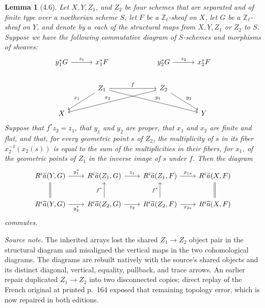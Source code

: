 \documentclass[10pt]{article}
\newcommand{\Z}{\mathbb Z}
\newtheorem*{lemma}{Lemma}
\begin{document}
\begin{lemma}[4.6]
Let $X,Y,Z_1$, and $Z_2$ be four schemes that are separated and of finite type over a noetherian scheme $S$, let $F$ be a $\Z_\ell$-sheaf on $X$, let $G$ be a $\Z_\ell$-sheaf on $Y$, and denote by $a$ each of the structural maps from $X,Y,Z_1$ or $Z_2$ to $S$. Suppose we have the following commutative diagram of $S$-schemes and morphisms of sheaves:
\begin{equation*}
\begin{tikzcd}[column sep=3.0em,row sep=2.0em]
y_1^*G \arrow[r,"z_1"] & x_1^*F && y_2^*G \arrow[r,"z_2"] & x_2^*F \\
& Z_1 \arrow[rr,"f"] \arrow[dl,"x_1"'] \arrow[drrr,"y_1"] &&
Z_2 \arrow[dlll,"x_2"'] \arrow[dr,"y_2"] & \\
X &&&& Y
\end{tikzcd}
\end{equation*}
Suppose that $f^*z_2=z_1$, that $y_1$ and $y_2$ are proper, that $x_1$ and $x_2$ are finite and flat, and that, for every geometric point $s$ of $Z_2$, the multiplicity of $s$ in its fiber $x_2^{-1}(x_2(s))$ is equal to the sum of the multiplicities in their fibers, for $x_1$, of the geometric points of $Z_1$ in the inverse image of $s$ under $f$. Then the diagram
\begin{equation*}
\begin{tikzcd}[column sep=2.2em,row sep=2.2em]
R^i\widetilde a(Y,G) \arrow[r,"y_1^*"] & R^i\widetilde a(Z_1,G) \arrow[r,"z_1"] &
R^i\widetilde a(Z_1,F) \arrow[r,"x_{1*}"] & R^i\widetilde a(X,F) \\
R^i\widetilde a(Y,G) \arrow[r,"y_2^*"'] \arrow[u,equal] &
R^i\widetilde a(Z_2,G) \arrow[r,"z_2"'] \arrow[u,"f^*"] &
R^i\widetilde a(Z_2,F) \arrow[r,"x_{2*}"'] \arrow[u,"f^*"] &
R^i\widetilde a(X,F) \arrow[u,equal]
\end{tikzcd}
\end{equation*}
commutes.
\end{lemma}

\noindent\emph{Source note.} The inherited arrays lost the shared $Z_1\to Z_2$ object pair in the structural diagram and misaligned the vertical maps in the two cohomological diagrams. The diagrams are rebuilt natively with the source's shared objects and its distinct diagonal, vertical, equality, pullback, and trace arrows. An earlier repair duplicated $Z_1\to Z_2$ into two disconnected copies; direct replay of the French original at printed p.~164 exposed that remaining topology error, which is now repaired in both editions.
\end{document}
